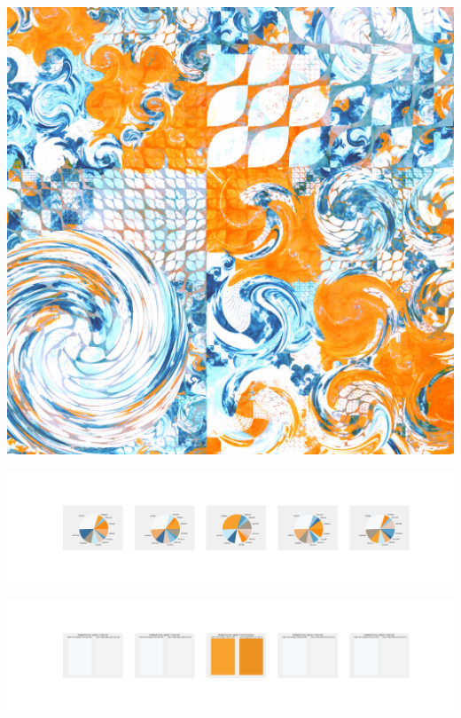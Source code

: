 \documentclass[11pt]{article}
\begin{document}
\begin{landscape}
    \begin{center}
    \includegraphics[width=\textwidth]{./nbimg/file (306).jpg}
    \end{center}

    \begin{center}
    \includegraphics[width=250mm]{./nbimg/pie-230.jpg}
    \end{center}

    \begin{center}
    \includegraphics[width=250mm]{./nbimg/peak-230.jpg}
    \end{center}
    


\end{landscape}
\end{document}
